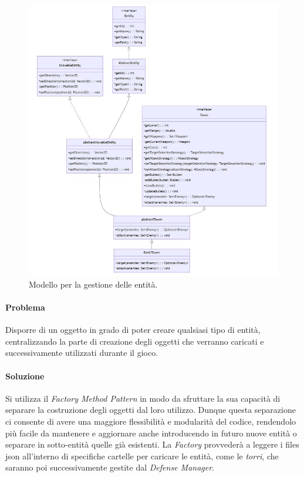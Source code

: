 \documentclass[a4paper,12pt]{report}
\begin{document}
\begin{figure}[H]
    \centering
    \includegraphics[width=1.2\linewidth]{defense_model}
    \caption{Modello per la gestione delle entità.}
    \label{fig:defense_model}
\end{figure}

\vspace{15mm}

\paragraph{Problema}
Disporre di un oggetto in grado di poter creare qualsiasi tipo di entità, centralizzando la parte di creazione degli oggetti che verranno caricati e successivamente utilizzati durante il gioco.

\paragraph{Soluzione}
Si utilizza il \textit{Factory Method Pattern} in modo da sfruttare la sua capacità di separare la costruzione degli oggetti dal loro utilizzo. Dunque questa separazione ci consente di avere una maggiore flessibilità e modularità del codice, rendendolo più facile da mantenere e aggiornare anche introducendo in futuro nuove entità o separare in sotto-entità quelle già esistenti. 
La \textit{Factory} provvederà a leggere i files json all'interno di specifiche cartelle per caricare
le entità, come le \textit{torri}, che saranno poi successivamente gestite dal \textit{Defense Manager}.
\end{document}
